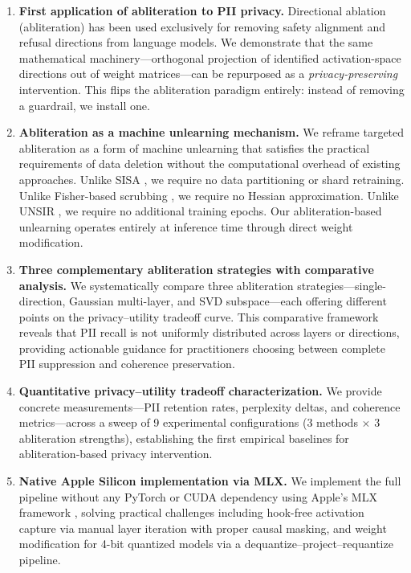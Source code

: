 \documentclass[11pt]{article}
\begin{document}
\begin{enumerate}
    \item \textbf{First application of abliteration to PII privacy.} Directional ablation (abliteration) \citep{heretic2025, arditi2024refusal, labonne2024uncensor} has been used exclusively for removing safety alignment and refusal directions from language models. We demonstrate that the same mathematical machinery---orthogonal projection of identified activation-space directions out of weight matrices---can be repurposed as a \textit{privacy-preserving} intervention. This flips the abliteration paradigm entirely: instead of removing a guardrail, we install one.

    \item \textbf{Abliteration as a machine unlearning mechanism.} We reframe targeted abliteration as a form of machine unlearning that satisfies the practical requirements of data deletion without the computational overhead of existing approaches. Unlike SISA \citep{bourtoule2021machine}, we require no data partitioning or shard retraining. Unlike Fisher-based scrubbing \citep{golatkar2020eternal}, we require no Hessian approximation. Unlike UNSIR \citep{tarun2023fast}, we require no additional training epochs. Our abliteration-based unlearning operates entirely at inference time through direct weight modification.

    \item \textbf{Three complementary abliteration strategies with comparative analysis.} We systematically compare three abliteration strategies---single-direction, Gaussian multi-layer, and SVD subspace---each offering different points on the privacy--utility tradeoff curve. This comparative framework reveals that PII recall is not uniformly distributed across layers or directions, providing actionable guidance for practitioners choosing between complete PII suppression and coherence preservation.

    \item \textbf{Quantitative privacy--utility tradeoff characterization.} We provide concrete measurements---PII retention rates, perplexity deltas, and coherence metrics---across a sweep of 9 experimental configurations (3 methods $\times$ 3 abliteration strengths), establishing the first empirical baselines for abliteration-based privacy intervention.

    \item \textbf{Native Apple Silicon implementation via MLX.} We implement the full pipeline without any PyTorch or CUDA dependency using Apple's MLX framework \citep{mlx2024}, solving practical challenges including hook-free activation capture via manual layer iteration with proper causal masking, and weight modification for 4-bit quantized models via a dequantize--project--requantize pipeline.
\end{enumerate}
\end{document}
